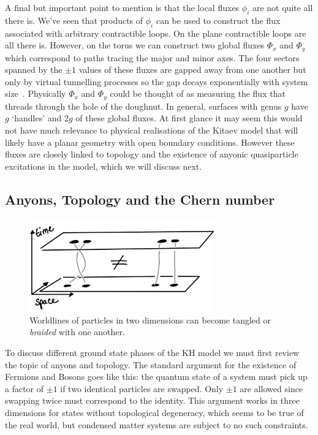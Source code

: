 A final but important point to mention is that the local fluxes \(\phi_i\) are not quite all there is. We've seen that products of \(\phi_i\) can be used to construct the flux associated with arbitrary contractible loops. On the plane contractible loops are all there is. However, on the torus we can construct two global fluxes \(\Phi_x\) and \(\Phi_y\) which correspond to paths tracing the major and minor axes. The four sectors spanned by the \(\pm1\) values of these fluxes are gapped away from one another but only by virtual tunnelling processes so the gap decays exponentially with system size~\autocite{kitaevAnyonsExactlySolved2006}. Physically \(\Phi_x\) and \(\Phi_y\) could be thought of as measuring the flux that threads through the hole of the doughnut. In general, surfaces with genus \(g\) have \(g\) `handles' and \(2g\) of these global fluxes. At first glance it may seem this would not have much relevance to physical realisations of the Kitaev model that will likely have a planar geometry with open boundary conditions. However these fluxes are closely linked to topology and the existence of anyonic quasiparticle excitations in the model, which we will discuss next.

\hypertarget{sec:anyons}{%
\subsection{Anyons, Topology and the Chern number}\label{sec:anyons}}

\hypertarget{fig:braiding}{%
\begin{figure}
\centering
\includegraphics[width=0.71\textwidth,height=\textheight]{figure_code/amk_chapter/braiding.png}
\caption[{Braiding in Two Dimensions}]{Worldlines of particles in two dimensions can become tangled or \emph{braided} with one another.}
\label{fig:braiding}
\end{figure}
}

To discuss different ground state phases of the KH model we must first review the topic of anyons and topology. The standard argument for the existence of Fermions and Bosons goes like this: the quantum state of a system must pick up a factor of \(\pm1\) if two identical particles are swapped. Only \(\pm1\) are allowed since swapping twice must correspond to the identity. This argument works in three dimensions for states without topological degeneracy, which seems to be true of the real world, but condensed matter systems are subject to no such constraints.

